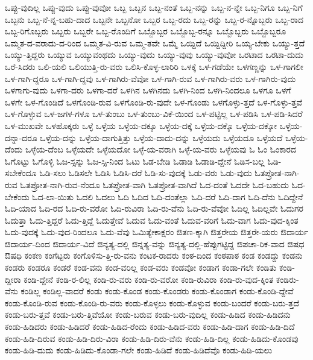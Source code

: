 {ಒಪ್ಪು-ವುದಿಲ್ಲ
ಒಪ್ಪು-ವುದು
ಒಪ್ಪು-ವುವೋ
ಒಬ್ಬ
ಒಬ್ಬನ
ಒಬ್ಬ-ನಂತೆ
ಒಬ್ಬ-ನನ್ನು
ಒಬ್ಬ-ನ-ನ್ನೇ
ಒಬ್ಬ-ನಿಗೂ
ಒಬ್ಬ-ನಿಗೆ
ಒಬ್ಬನು
ಒಬ್ಬ-ನೆ-ನ್ನ-ಬಹು-ದಾದ
ಒಬ್ಬನೇ
ಒಬ್ಬನೋ
ಒಬ್ಬರ
ಒಬ್ಬ-ರದು
ಒಬ್ಬ-ರನ್ನು
ಒಬ್ಬ-ರ-ನ್ನೊಬ್ಬರು
ಒಬ್ಬ-ರಾದ
ಒಬ್ಬ-ರಿಗೊಬ್ಬರು
ಒಬ್ಬರು
ಒಬ್ಬರೇ
ಒಬ್ಬ-ರೊಂದಿಗೆ
ಒಬ್ಬೊಬ್ಬರ
ಒಬ್ಬೊಬ್ಬ-ರನ್ನೂ
ಒಬ್ಬೊಬ್ಬರು
ಒಬ್ಬೊಬ್ಬರೂ
ಒಮ್ಮತ-ದ-ವರಾದು-ದ-ರಿಂದ
ಒಮ್ಮತ-ವಿ-ರುವ
ಒಮ್ಮ-ತವೇ
ಒಮ್ಮೆ
ಒಯ್ದಿದೆ
ಒಯ್ದಿದ್ದೀರಿ
ಒಯ್ಯ-ಬೇಕು
ಒಯ್ಯು-ತ್ತದೆ
ಒಯ್ಯು-ತ್ತಿದ್ದರು
ಒಯ್ಯುವ
ಒಯ್ಯುವಂಥದು
ಒಯ್ಯು-ವುದು
ಒಯ್ಯು-ವುವು
ಒಯ್ಯು-ವುವೋ
ಒರಟಾದ
ಒರಟಾ-ದುದು
ಒರೆ-ಸಿದರು
ಒಲಿ-ಯಲಿ
ಒಲಿಯುತ್ತಿ-ರು-ವರು
ಒಲಿಸಿ-ಕೊಳ್ಳ-ಲಾರಿರಿ
ಒಳಕ್ಕೆ
ಒಳ-ಗಡೆಯೇ
ಒಳಗಣ್ಣನ್ನು
ಒಳ-ಗಾಗಲೀ
ಒಳ-ಗಾಗಿ-ದ್ದರೂ
ಒಳ-ಗಾಗಿ-ದ್ದವು
ಒಳ-ಗಾಗಿರು-ವೆವೋ
ಒಳ-ಗಾಗಿ-ರುವ
ಒಳ-ಗಾಗಿರು-ವರು
ಒಳ-ಗಾಗಿರು-ವುದು
ಒಳಗಾಗು-ವುದು
ಒಳಗಾ-ದರು
ಒಳಗಾ-ದರೆ
ಒಳಗಿನ
ಒಳಗಿನದು
ಒಳಗಿ-ನಿಂದ
ಒಳಗಿ-ನಿಂದಲೂ
ಒಳಗೂ
ಒಳಗೆ
ಒಳಗೇ
ಒಳ-ಗೊಂಡಿದೆ
ಒಳಗೊಂಡಿ-ರುವ
ಒಳಗೊಂಡಿ-ರು-ವುದೇ
ಒಳ-ಗೊಂಡು
ಒಳಗೊಳ್ಳು-ತ್ತದೆ
ಒಳ-ಗೊಳ್ಳು-ತ್ತವೆ
ಒಳ-ಗೊಳ್ಳುವ
ಒಳ-ಜಗಳ-ಗಳೂ
ಒಳ-ತುಂಬು
ಒಳ-ತುಂಬು-ವಿಕೆ-ಯಿಂದ
ಒಳ-ಪಟ್ಟಿಲ್ಲ
ಒಳ-ಪಡಿಸಿ
ಒಳ-ಪಡಿ-ಸಿದರೆ
ಒಳ-ಮುಖವೇ
ಒಳಹೊಕ್ಕರು
ಒಳ್ಳೆ
ಒಳ್ಳೆಯ
ಒಳ್ಳೆಯ-ದಕ್ಕೂ
ಒಳ್ಳೆಯ-ದಕ್ಕೆ
ಒಳ್ಳೆಯ-ದಕ್ಕೊ
ಒಳ್ಳೆಯ-ದಕ್ಕೋ
ಒಳ್ಳೆಯ-ದನ್ನಾ-ದರೂ
ಒಳ್ಳೆಯ-ದನ್ನು
ಒಳ್ಳೆಯ-ದಾಗುತ್ತಿತ್ತು
ಒಳ್ಳೆಯ-ದಾದು-ದನ್ನು
ಒಳ್ಳೆಯದು
ಒಳ್ಳೆಯದೂ
ಒಳ್ಳೆಯದೆ
ಒಳ್ಳೆಯ-ದೆಂದು
ಒಳ್ಳೆಯ-ದೆಂಬ
ಒಳ್ಳೆಯದೇ
ಒಳ್ಳೆಯದೋ
ಒಳ್ಳೆ-ಯ-ವರಾಗಿ
ಒಳ್ಳೆ-ಯ-ವರು
ಒಳ್ಳೆಯವು
ಓ
ಓಂ
ಓಂಕಾರದ
ಓಗೊಟ್ಟು
ಓಗೊಳ್ಳಿ
ಓಜ-ಸ್ಸನ್ನು
ಓಜ-ಸ್ಸಿ-ನಿಂದ
ಓಟು
ಓಡ-ಬೇಡಿ
ಓಡಾಡಿ
ಓಡಾಡಿ-ದ್ದೇನೆ
ಓಡಿಸ-ಬಲ್ಲ
ಓಡಿ-ಸಬೇಕೆಂದೂ
ಓಡಿ-ಸಲು
ಓಡಿಸಲೇ
ಓಡಿಸಿ
ಓಡಿಸಿ-ದರೆ
ಓಡಿ-ಸು-ವುದಕ್ಕೆ
ಓಡು-ವರು
ಓಡು-ವುದು
ಓತಪ್ರೋತ-ನಾಗಿ-ರುವ
ಓತಪ್ರೋತ-ನಾಗಿ-ರುವ-ನೆಂದೂ
ಓತಪ್ರೋತ-ವಾಗಿ
ಓತಪ್ರೋತ-ವಾಗಿದೆ
ಓದ-ದಂತೆ
ಓದದೇ
ಓದ-ಬಹುದು
ಓದ-ಬೇಕೆಂದು
ಓದ-ಲಾ-ಯಿತು
ಓದಲಿ
ಓದಲು
ಓದಿ
ಓದಿದ
ಓದಿ-ದಂತೆಲ್ಲಾ
ಓದಿ-ದರೆ
ಓದಿ-ದಾಗ
ಓದಿ-ದೆನು
ಓದಿದ್ದೇನೆ
ಓದಿ-ಯಾದ
ಓದಿ-ರದ
ಓದಿ-ರು-ವರೋ
ಓದಿ-ರುವಿರಾ
ಓದಿ-ರು-ವೆನು
ಓದಿ-ರು-ವೆವೋ
ಓದಿಲ್ಲ
ಓದಿಲ್ಲವೇ
ಓದುಗರ
ಓದುತ್ತಾ
ಓದು-ತ್ತಿದ್ದರೆ
ಓದು-ತ್ತಿದ್ದೆ
ಓದುತ್ತೇವೆ
ಓದುವ
ಓದು-ವಂತೆ
ಓದುವ-ವರಿಗೆ
ಓದು-ವಾಗ
ಓದು-ವುದ-ಕ್ಕಿಂತ
ಓದು-ವುದಕ್ಕೆ
ಓದು-ವುದ-ರಿಂದಲೂ
ಓದು-ವೆವು
ಓಮಿತ್ಯೇಕಾಕ್ಷರಂ
ಔತಣ-ಕ್ಕಾಗಿ
ಔತ್ತರೇಯ
ಔತ್ತರೇ-ಯರು
ಔದಾರ್ಯ
ಔದಾರ್ಯ-ದಿಂದ
ಔದಾರ್ಯ-ವಿದೆ
ಔನ್ಯತ್ಯ-ದಲ್ಲಿ
ಔನ್ನತ್ಯ-ವನ್ನು
ಔನ್ಯತ್ಯ-ದಲ್ಲಿ-ಹೆಪ್ಪುಗಟ್ಟಿದ್ದ
ಔಪಚಾ-ರಿಕ-ವಾದ
ಔಷಧ
ಔಷಧಿ
ಕಂಕಣ
ಕಂಗೆಟ್ಟರು
ಕಂಗೊಳಿಸು-ತ್ತಿ-ರು-ವನು
ಕಂಟಕ-ರಾದರು
ಕಂಠ-ದಿಂದ
ಕಂಠಪಾಠ
ಕಂಡ
ಕಂಡದ್ದು
ಕಂಡನು
ಕಂಡರು
ಕಂಡರೂ
ಕಂಡರೆ
ಕಂಡ-ವನು
ಕಂಡ-ವರಿಲ್ಲ
ಕಂಡ-ವರು
ಕಂಡವೋ
ಕಂಡಾಗ
ಕಂಡಾ-ಗಲೇ
ಕಂಡಿತು
ಕಂಡಿ-ದ್ದೀರಾ
ಕಂಡಿ-ದ್ದೇನೆ
ಕಂಡಿ-ರ-ಲಿಲ್ಲ
ಕಂಡಿ-ರು-ವರು
ಕಂಡಿ-ರು-ವರೋ
ಕಂಡಿ-ರುವಿರಾ
ಕಂಡಿ-ರು-ವುದ-ಕ್ಕಿಂತ
ಕಂಡಿರು-ವೆನು
ಕಂಡಿಲ್ಲ
ಕಂಡಿಲ್ಲ-ವಾದರೆ
ಕಂಡು
ಕಂಡು-ಕೊಂಡ
ಕಂಡು-ಕೊಂಡರು
ಕಂಡು-ಕೊಂಡಾಗ
ಕಂಡು-ಕೊಂಡಿ-ದ್ದೇವೆ
ಕಂಡು-ಕೊಂಡಿ-ರುವ
ಕಂಡು-ಕೊಂಡಿ-ರು-ವರು
ಕಂಡು-ಕೊಳ್ಳಲು
ಕಂಡು-ಕೊಳ್ಳುವ
ಕಂಡು-ಬಂದರೆ
ಕಂಡು-ಬರು-ತ್ತದೆ
ಕಂಡು-ಬರು-ತ್ತವೆ
ಕಂಡು-ಬರು-ತ್ತಿವೆಯೋ
ಕಂಡು-ಬರುವ
ಕಂಡು-ಬರು-ವುದಿಲ್ಲ
ಕಂಡು-ಹಿಡಿದ
ಕಂಡು-ಹಿಡಿದನು
ಕಂಡು-ಹಿಡಿದರು
ಕಂಡು-ಹಿಡಿದರೆ
ಕಂಡು-ಹಿಡಿದ-ರೆಂದು
ಕಂಡು-ಹಿಡಿದ-ವರು
ಕಂಡು-ಹಿಡಿ-ದಾಗ
ಕಂಡು-ಹಿಡಿ-ದಿದೆ
ಕಂಡು-ಹಿಡಿ-ದಿರುವ
ಕಂಡು-ಹಿಡಿ-ದಿರು-ವಿರಾ
ಕಂಡು-ಹಿಡಿ-ದಿರು-ವೆನು
ಕಂಡು-ಹಿಡಿ-ದಿಲ್ಲ
ಕಂಡು-ಹಿಡಿದು-ಕೊಂಡವು
ಕಂಡು-ಹಿಡಿ-ದುದು
ಕಂಡು-ಹಿಡಿದು-ಕೊಂಡಾ-ಗಲೇ
ಕಂಡು-ಹಿಡಿದೆ
ಕಂಡು-ಹಿಡಿದೆವೊ
ಕಂಡು-ಹಿಡಿ-ಯಲು
}
